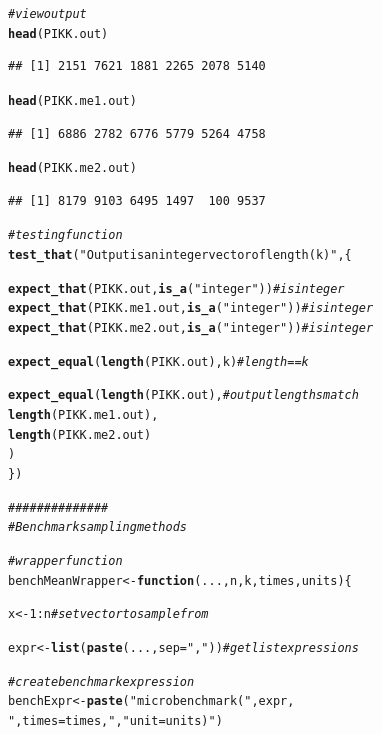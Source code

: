 \documentclass{article}\usepackage[]{graphicx}\usepackage[]{color}
\makeatletter
\newcommand{\hlnum}[1]{\textcolor[rgb]{0.686,0.059,0.569}{#1}}%
\newcommand{\hlstr}[1]{\textcolor[rgb]{0.192,0.494,0.8}{#1}}%
\newcommand{\hlcom}[1]{\textcolor[rgb]{0.678,0.584,0.686}{\textit{#1}}}%
\newcommand{\hlopt}[1]{\textcolor[rgb]{0,0,0}{#1}}%
\newcommand{\hlstd}[1]{\textcolor[rgb]{0.345,0.345,0.345}{#1}}%
\newcommand{\hlkwa}[1]{\textcolor[rgb]{0.161,0.373,0.58}{\textbf{#1}}}%
\newcommand{\hlkwb}[1]{\textcolor[rgb]{0.69,0.353,0.396}{#1}}%
\newcommand{\hlkwc}[1]{\textcolor[rgb]{0.333,0.667,0.333}{#1}}%
\newcommand{\hlkwd}[1]{\textcolor[rgb]{0.737,0.353,0.396}{\textbf{#1}}}%
\newenvironment{kframe}{%
 \def\at@end@of@kframe{}%
 \ifinner\ifhmode%
  \def\at@end@of@kframe{\end{minipage}}%
  \begin{minipage}{\columnwidth}%
 \fi\fi%
 \def\FrameCommand##1{\hskip\@totalleftmargin \hskip-\fboxsep
 \colorbox{shadecolor}{##1}\hskip-\fboxsep
     \hskip-\linewidth \hskip-\@totalleftmargin \hskip\columnwidth}%
 \MakeFramed {\advance\hsize-\width
   \@totalleftmargin\z@ \linewidth\hsize
   \@setminipage}}%
 {\par\unskip\endMakeFramed%
 \at@end@of@kframe}
\newenvironment{knitrout}{}{} %
\makeatother
\begin{document}
\begin{knitrout}
\begin{kframe}
\begin{alltt}
\hlcom{#view output}
\hlkwd{head}\hlstd{(PIKK.out)}
\end{alltt}
\begin{verbatim}
## [1] 2151 7621 1881 2265 2078 5140
\end{verbatim}
\begin{alltt}
\hlkwd{head}\hlstd{(PIKK.me1.out)}
\end{alltt}
\begin{verbatim}
## [1] 6886 2782 6776 5779 5264 4758
\end{verbatim}
\begin{alltt}
\hlkwd{head}\hlstd{(PIKK.me2.out)}
\end{alltt}
\begin{verbatim}
## [1] 8179 9103 6495 1497  100 9537
\end{verbatim}
\begin{alltt}
\hlcom{#testing function}
\hlkwd{test_that}\hlstd{(}\hlstr{"Output is an integer vector of length(k)"}\hlstd{, \{}

    \hlkwd{expect_that}\hlstd{(PIKK.out,} \hlkwd{is_a}\hlstd{(}\hlstr{"integer"}\hlstd{))}        \hlcom{#is integer}
    \hlkwd{expect_that}\hlstd{(PIKK.me1.out,} \hlkwd{is_a}\hlstd{(}\hlstr{"integer"}\hlstd{))}    \hlcom{#is integer}
    \hlkwd{expect_that}\hlstd{(PIKK.me2.out,} \hlkwd{is_a}\hlstd{(}\hlstr{"integer"}\hlstd{))}    \hlcom{#is integer}

    \hlkwd{expect_equal}\hlstd{(} \hlkwd{length}\hlstd{(PIKK.out), k)}             \hlcom{#length==k}

    \hlkwd{expect_equal}\hlstd{(}\hlkwd{length}\hlstd{(PIKK.out),}                 \hlcom{#output lengths match}
                 \hlkwd{length}\hlstd{(PIKK.me1.out),}
                 \hlkwd{length}\hlstd{(PIKK.me2.out)}
                \hlstd{)}
\hlstd{\})}

\hlcom{##############}
\hlcom{#Benchmark sampling methods}

\hlcom{#wrapper function}
\hlstd{benchMeanWrapper} \hlkwb{<-} \hlkwa{function}\hlstd{(}\hlkwc{...}\hlstd{,} \hlkwc{n}\hlstd{,} \hlkwc{k}\hlstd{,} \hlkwc{times}\hlstd{,} \hlkwc{units}\hlstd{) \{}

    \hlstd{x} \hlkwb{<-} \hlnum{1}\hlopt{:}\hlstd{n}   \hlcom{#set vector to sample from}

    \hlstd{expr} \hlkwb{<-} \hlkwd{list}\hlstd{(}\hlkwd{paste}\hlstd{(...,} \hlkwc{sep} \hlstd{=} \hlstr{","}\hlstd{))} \hlcom{#get list expressions}

    \hlcom{#create benchmark expression}
    \hlstd{benchExpr} \hlkwb{<-} \hlkwd{paste}\hlstd{(}\hlstr{"microbenchmark("}\hlstd{, expr,}
                       \hlstr{", times = times,"}\hlstd{,} \hlstr{"unit = units)"}\hlstd{)}


\end{alltt}
\end{kframe}
\end{knitrout}
\end{document}
